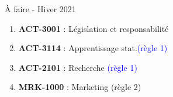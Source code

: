 \documentclass[9pt, french]{article}
\begin{document}
\begin{multicols*}{3}
\medskip


\begin{algo2}{À faire - Hiver 2021}
\begin{enumerate}
	\item[] \textbf{ACT-3001} : Législation et responsabilité      
	\item[] \textbf{ACT-3114} : Apprentissage stat.\textcolor{blue}{(règle 1)} 
	\item[] \textbf{ACT-2101} : Recherche \textcolor{blue}{(règle 1)} 
	\item[] \textbf{MRK-1000} : Marketing \textcolor{brass}{(règle 2)}   
\end{enumerate}
\end{algo2}


\end{multicols*}
\end{document}
